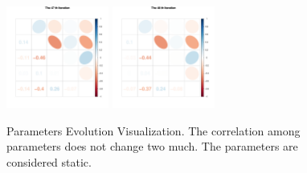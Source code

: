 \begin{figure}[h]
\includegraphics[width=0.3\textwidth,height=0.2\textheight]{Chapters/05MCMCOU/plots/paraEvolution/corMatrix47.pdf}
\includegraphics[width=0.3\textwidth,height=0.2\textheight]{Chapters/05MCMCOU/plots/paraEvolution/corMatrix48.pdf}
\caption{Parameters Evolution Visualization. The correlation among parameters does not change two much. The parameters are considered static. }
\end{figure}
